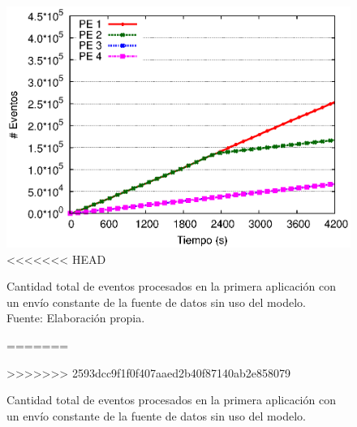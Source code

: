 \begin{figure}[!ht]
	\centering
	\captionsetup{justification=centering}
    \includegraphics[scale=0.7]{images/exp/app1/uniform/sm/eventCount.eps}
<<<<<<< HEAD
    \caption[Cantidad total de eventos procesados en la primera aplicación con un envío constante de la fuente de datos sin uso del modelo.]{Cantidad total de eventos procesados en la primera aplicación con un envío constante de la fuente de datos sin uso del modelo.\\Fuente: Elaboración propia.}
=======
    \caption{Cantidad total de eventos procesados en la primera aplicaci\'on con un env\'io constante de la fuente de datos sin uso del modelo.}
>>>>>>> 2593dcc9f1f0f407aaed2b40f87140ab2e858079
    \label{fig:app1-uniform-eventCount-sm}
\end{figure}


